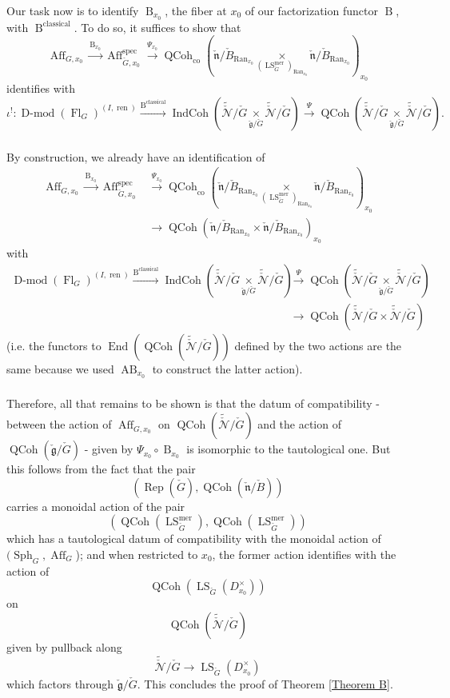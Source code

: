 \documentclass[10pt]{amsart}
\theoremstyle{remark}
\newcommand{\on}[1]{\operatorname{#1}}
\newcommand{\Dmod}{\on{D-mod}}
\newcommand{\QCoh}{\on{QCoh}}
\newcommand{\IndCoh}{\on{IndCoh}}
\newcommand{\Gcheck}{\check{G}}
\newcommand{\gcheck}{\check{\mathfrak{g}}}
\newcommand{\ncheck}{\check{\mathfrak{n}}}
\newcommand{\Bcheck}{\check{B}}
\newcommand{\Ran}{\on{Ran}}
\newcommand{\sssec}[1]{\subsubsection{}}
\begin{document}
\sssec{}
Our task now is to identify $\on{B}_{x_0}$, the fiber at $x_0$ of our factorization functor $\on{B}$, with $\on{B}^{\on{classical}}$. To do so, it suffices to show that 
$$
\on{Aff}_{G, x_0} \overset{\on{B}_{x_0}}{\longrightarrow} \on{Aff}_{\Gcheck, x_0}^{\on{spec}} \overset{\Psi_{x_0}}{\longrightarrow} \QCoh_{\on{co}}(\ncheck/\Bcheck_{\Ran_{x_0}} \underset{(\on{LS}_{\Gcheck}^{\on{mer}})_{\Ran_{x_0}}}{\times} \ncheck/\Bcheck_{\Ran_{x_0}})_{x_0}
$$
identifies with
$$
\iota^!: \Dmod(\on{Fl}_{G})^{(I, \on{ren})} \overset{\on{B}^{\on{classical}}}{\longrightarrow} \IndCoh(\tilde{\check{\mathcal{N}}}/\Gcheck \underset{\gcheck/\Gcheck}{\times} \tilde{\check{\mathcal{N}}}/\Gcheck) \overset{\Psi}{\longrightarrow} \QCoh(\tilde{\check{\mathcal{N}}}/\Gcheck \underset{\gcheck/\Gcheck}{\times} \tilde{\check{\mathcal{N}}}/\Gcheck).
$$

\sssec{}
By construction, we already have an identification of
\begin{align}
\on{Aff}_{G, x_0} \overset{\on{B}_{x_0}}{\longrightarrow} \on{Aff}_{\Gcheck, x_0}^{\on{spec}} &\overset{\Psi_{x_0}}{\longrightarrow} \QCoh_{\on{co}}(\ncheck/\Bcheck_{\Ran_{x_0}} \underset{(\on{LS}_{\Gcheck}^{\on{mer}})_{\Ran_{x_0}}}{\times} \ncheck/\Bcheck_{\Ran_{x_0}})_{x_0} \\ &\longrightarrow \on{QCoh}(\ncheck/\Bcheck_{\Ran_{x_0}} \times \ncheck/\Bcheck_{\Ran_{x_0}})_{x_0}
\end{align}
with
\begin{align}
    \Dmod(\on{Fl}_{G})^{(I, \on{ren})} \overset{\on{B}^{\on{classical}}}{\longrightarrow} \IndCoh(\tilde{\check{\mathcal{N}}}/\Gcheck \underset{\gcheck/\Gcheck}{\times} \tilde{\check{\mathcal{N}}}/\Gcheck) &\overset{\Psi}{\longrightarrow} \QCoh(\tilde{\check{\mathcal{N}}}/\Gcheck \underset{\gcheck/\Gcheck}{\times} \tilde{\check{\mathcal{N}}}/\Gcheck) \\ &\longrightarrow \on{QCoh}(\tilde{\check{\mathcal{N}}}/\Gcheck \times \tilde{\check{\mathcal{N}}}/\Gcheck)
\end{align}
(i.e. the functors to $\on{End}(\on{QCoh}(\tilde{\check{\mathcal{N}}}/\Gcheck))$ defined by the two actions are the same because we used $\on{AB}_{x_0}$ to construct the latter action).

\sssec{}
Therefore, all that remains to be shown is that the datum of compatibility - between the action of $\on{Aff}_{G, x_0}$ on $\on{QCoh}(\tilde{\check{\mathcal{N}}}/\Gcheck)$ and the action of $\QCoh(\gcheck/\Gcheck)$ - given by $\Psi_{x_0} \circ \on{B}_{x_0}$ is isomorphic to the tautological one. But this follows from the fact that the pair
$$
(\on{Rep}(\Gcheck), \QCoh(\ncheck/\Bcheck))
$$
carries a monoidal action of the pair
$$
(\QCoh(\on{LS}_{\Gcheck}^{\on{mer}}), \QCoh(\on{LS}_{\Gcheck}^{\on{mer}}))
$$
which has a tautological datum of compatibility with the monoidal action of $(\on{Sph}_G, \on{Aff}_{G}$); and when restricted to $x_0$, the former action identifies with the action of
$$
\QCoh(\on{LS}_{\Gcheck}(D_{x_0}^{\times}))
$$
on
$$
\QCoh(\tilde{\check{\mathcal{N}}}/\Gcheck)
$$
given by pullback along
$$
\tilde{\check{\mathcal{N}}}/\Gcheck \longrightarrow\on{LS}_{\Gcheck}(D_{x_0}^{\times})
$$
which factors through $\gcheck/\Gcheck$. This concludes the proof of Theorem \ref{Theorem B}.
\end{document}
